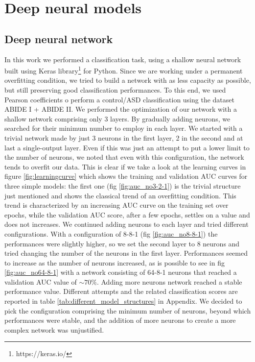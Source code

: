 \documentclass[11pt]{report}
\begin{document}
\newpage
\chapter{Deep neural models} \label{chap:deep_models}

\section{Deep neural network}

In this work we performed a classification task, using a shallow neural network built using Keras library\footnote{https://keras.io/} for Python.
Since we are working under a permanent overfitting condition, we tried to build a network with as less capacity as possible, but still preserving good classification performances.
To this end, we used Pearson coefficients o perform a control/ASD classification using the dataset ABIDE I + ABIDE II.
We performed the optimization of our network with a shallow network comprising only 3 layers.
By gradually adding neurons, we searched for their minimum number to employ in each layer.
We started with a trivial network made by just 3 neurons in the first layer, 2 in the second and at last a single-output layer.
Even if this was just an attempt to put a lower limit to the number of neurons, we noted that even with this configuration, the network tends to overfit our data.
This is clear if we take a look at the learning curves in figure \ref{fig:learningcurve} which shows the training and validation AUC curves for three simple models: the first one (fig \ref{fig:auc_no3-2-1}) is the trivial structure just mentioned and shows the classical trend of an overfitting condition.
This trend is characterized by an increasing AUC curve on the training set over epochs, while the validation AUC score, after a few epochs, settles on a value and does not increases. 
We continued adding neurons to each layer and tried different configurations. 
With a configuration of 8-8-1 (fig \ref{fig:auc_no8-8-1}) the performances were slightly higher, so we set the second layer to 8 neurons and tried changing the number of the neurons in the first layer.
Performances seemed to increase as the number of neurons increased, as is possible to see in fig \ref{fig:auc_no64-8-1} with a network consisting of 64-8-1 neurons that reached a validation AUC value of $\sim 70\%$. 
Adding more neurons network reached a stable performance value.
Different attempts and the related classification scores are reported in table \ref{tab:different_model_structures} in Appendix.
We decided to pick the configuration comprising the minimum number of neurons, beyond which performances were stable, and the addition of more neurons to create a more complex network was unjustified.
\end{document}
